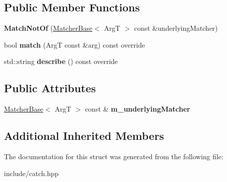 \subsection*{Public Member Functions}
\begin{DoxyCompactItemize}
\item 
{\bfseries Match\+Not\+Of} (\hyperlink{structCatch_1_1Matchers_1_1Impl_1_1MatcherBase}{Matcher\+Base}$<$ ArgT $>$ const \&underlying\+Matcher)\hypertarget{structCatch_1_1Matchers_1_1Impl_1_1MatchNotOf_a47afdd9e4c3354cef85adc3186097ae4}{}\label{structCatch_1_1Matchers_1_1Impl_1_1MatchNotOf_a47afdd9e4c3354cef85adc3186097ae4}

\item 
bool {\bfseries match} (ArgT const \&arg) const override\hypertarget{structCatch_1_1Matchers_1_1Impl_1_1MatchNotOf_a181d693c0258e582d80dc6117a1f2b66}{}\label{structCatch_1_1Matchers_1_1Impl_1_1MatchNotOf_a181d693c0258e582d80dc6117a1f2b66}

\item 
std\+::string {\bfseries describe} () const override\hypertarget{structCatch_1_1Matchers_1_1Impl_1_1MatchNotOf_ac5fb4ef6a9069d23a4098c3c818f06b0}{}\label{structCatch_1_1Matchers_1_1Impl_1_1MatchNotOf_ac5fb4ef6a9069d23a4098c3c818f06b0}

\end{DoxyCompactItemize}
\subsection*{Public Attributes}
\begin{DoxyCompactItemize}
\item 
\hyperlink{structCatch_1_1Matchers_1_1Impl_1_1MatcherBase}{Matcher\+Base}$<$ ArgT $>$ const \& {\bfseries m\+\_\+underlying\+Matcher}\hypertarget{structCatch_1_1Matchers_1_1Impl_1_1MatchNotOf_af7ac67f112b0e93796b048a47329aad4}{}\label{structCatch_1_1Matchers_1_1Impl_1_1MatchNotOf_af7ac67f112b0e93796b048a47329aad4}

\end{DoxyCompactItemize}
\subsection*{Additional Inherited Members}


The documentation for this struct was generated from the following file\+:\begin{DoxyCompactItemize}
\item 
include/catch.\+hpp\end{DoxyCompactItemize}
